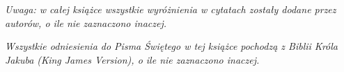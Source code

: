 \thispagestyle{empty}

\vspace*{1cm}

\begin{center}
    \textit{Uwaga: w całej książce wszystkie wyróżnienia w cytatach zostały dodane przez autorów, o ile nie zaznaczono inaczej.}
    
    \textit{Wszystkie odniesienia do Pisma Świętego w tej książce pochodzą z Biblii Króla Jakuba (King James Version), o ile nie zaznaczono inaczej.}
\end{center}

\cleardoublepage